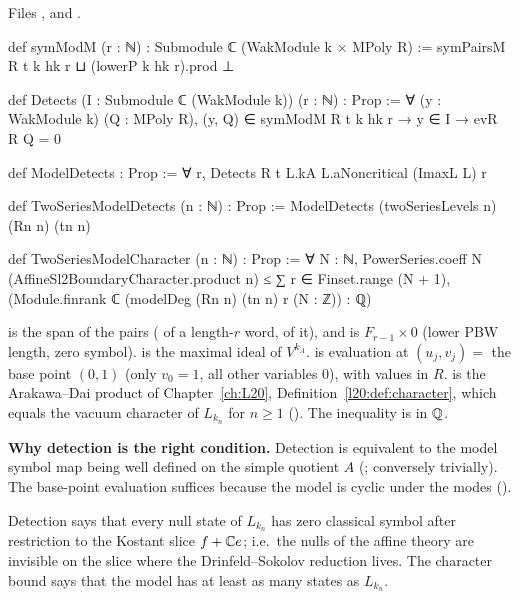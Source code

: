 \noindent Files ,
 and
.
\begin{leancode}
def symModM (r : ℕ) : Submodule ℂ (WakModule k × MPoly R) :=
  symPairsM R t k hk r ⊔ (lowerP k hk r).prod ⊥

def Detects (I : Submodule ℂ (WakModule k)) (r : ℕ) : Prop :=
  ∀ (y : WakModule k) (Q : MPoly R), (y, Q) ∈ symModM R t k hk r → y ∈ I → evR R Q = 0

def ModelDetects : Prop :=
  ∀ r, Detects R t L.kA L.aNoncritical (ImaxL L) r

def TwoSeriesModelDetects (n : ℕ) : Prop :=
  ModelDetects (twoSeriesLevels n) (Rn n) (tn n)

def TwoSeriesModelCharacter (n : ℕ) : Prop :=
  ∀ N : ℕ, PowerSeries.coeff N (AffineSl2BoundaryCharacter.product n) ≤
    ∑ r ∈ Finset.range (N + 1), (Module.finrank ℂ (modelDeg (Rn n) (tn n) r (N : ℤ)) : ℚ)
\end{leancode}

\begin{dictionary}
 is the span of the pairs ( of a length-$r$ word,  of it), and
 is $F_{r-1}\times0$ (lower PBW length, zero symbol).  is the maximal ideal of
$V^{k_A}$.  is evaluation at $(u_j,v_j)=$ the base point $(0,1)$ (only $v_0=1$, all other variables $0$),
with values in $R$.  is the Arakawa--Dai product of Chapter~\ref{ch:L20},
Definition~\ref{l20:def:character}, which equals the vacuum character of $L_{k_n}$ for $n\ge1$
(). The inequality is in ${\mathbb{Q}}$.

\textbf{Why detection is the right condition.} Detection is equivalent to the model symbol map being well defined on
the simple quotient $A$ (; conversely trivially). The base-point evaluation suffices
because the model is cyclic under the modes ().
\end{dictionary}

\begin{physics}
Detection says that every null state of $L_{k_n}$ has zero classical symbol after restriction to the Kostant slice
$f+{\mathbb{C}} e$; i.e.\ the nulls of the affine theory are invisible on the slice where the Drinfeld--Sokolov reduction lives.
The character bound says that the model has at least as many states as $L_{k_n}$.
\end{physics}

